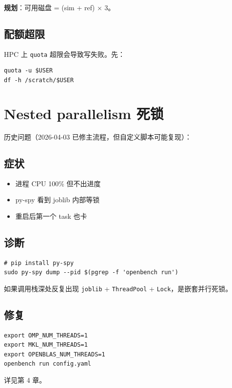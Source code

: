 \textbf{规划}：可用磁盘 = (sim + ref) × 3。

\subsection{配额超限}

HPC 上 \texttt{quota} 超限会导致写失败。先：

\begin{verbatim}
quota -u $USER
df -h /scratch/$USER
\end{verbatim}

\section{Nested parallelism 死锁}

历史问题（2026-04-03 已修主流程，但自定义脚本可能复现）：

\subsection{症状}

\begin{itemize}
  \item 进程 CPU 100\% 但不出进度
  \item py-spy 看到 joblib 内部等锁
  \item 重启后第一个 task 也卡
\end{itemize}

\subsection{诊断}

\begin{verbatim}
# pip install py-spy
sudo py-spy dump --pid $(pgrep -f 'openbench run')
\end{verbatim}

如果调用栈深处反复出现 \texttt{joblib} + \texttt{ThreadPool} + \texttt{Lock}，是嵌套并行死锁。

\subsection{修复}

\begin{verbatim}
export OMP_NUM_THREADS=1
export MKL_NUM_THREADS=1
export OPENBLAS_NUM_THREADS=1
openbench run config.yaml
\end{verbatim}

详见第 4 章。

